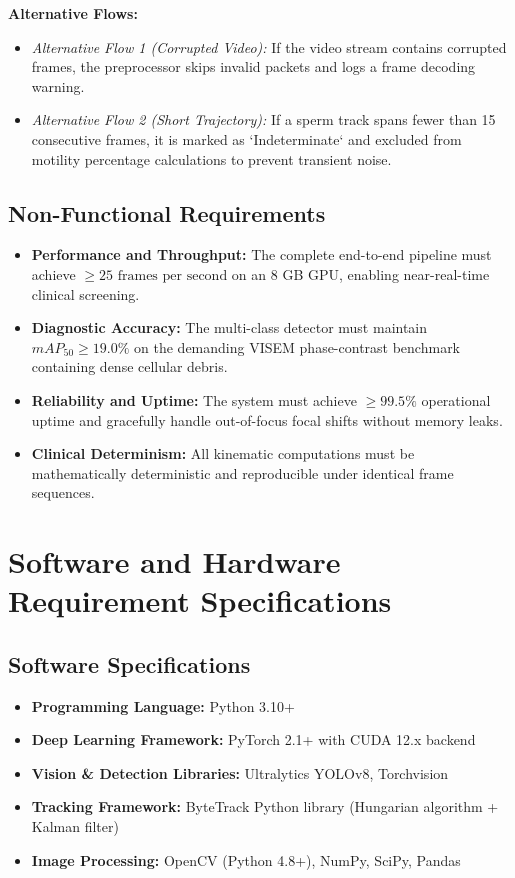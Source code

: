 \documentclass[12pt,a4paper]{report}
\begin{document}
\textbf{Alternative Flows:}
\begin{itemize}
    \item \textit{Alternative Flow 1 (Corrupted Video):} If the video stream contains corrupted frames, the preprocessor skips invalid packets and logs a frame decoding warning.
    \item \textit{Alternative Flow 2 (Short Trajectory):} If a sperm track spans fewer than 15 consecutive frames, it is marked as `Indeterminate` and excluded from motility percentage calculations to prevent transient noise.
\end{itemize}

\subsection{Non-Functional Requirements}
\begin{itemize}
    \item \textbf{Performance and Throughput:} The complete end-to-end pipeline must achieve $\ge 25\text{ frames per second}$ on an 8 GB GPU, enabling near-real-time clinical screening.
    \item \textbf{Diagnostic Accuracy:} The multi-class detector must maintain $mAP_{50} \ge 19.0\%$ on the demanding VISEM phase-contrast benchmark containing dense cellular debris.
    \item \textbf{Reliability and Uptime:} The system must achieve $\ge 99.5\%$ operational uptime and gracefully handle out-of-focus focal shifts without memory leaks.
    \item \textbf{Clinical Determinism:} All kinematic computations must be mathematically deterministic and reproducible under identical frame sequences.
\end{itemize}

\section{Software and Hardware Requirement Specifications}
\subsection{Software Specifications}
\begin{itemize}
    \item \textbf{Programming Language:} Python 3.10+
    \item \textbf{Deep Learning Framework:} PyTorch 2.1+ with CUDA 12.x backend
    \item \textbf{Vision \& Detection Libraries:} Ultralytics YOLOv8, Torchvision
    \item \textbf{Tracking Framework:} ByteTrack Python library (Hungarian algorithm + Kalman filter)
    \item \textbf{Image Processing:} OpenCV (Python 4.8+), NumPy, SciPy, Pandas
\end{itemize}
\end{document}
